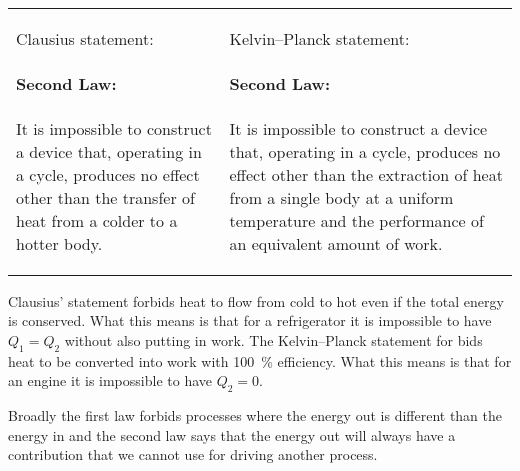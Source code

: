 \documentclass[a4paper]{article}
\begin{document}
    \begin{tabular}{p{}p{}}
        Clausius statement:
        \paragraph{Second Law:} It is impossible to construct a device that, operating in a cycle, produces no effect other than the transfer of heat from a colder to a hotter body. &
        
        Kelvin--Planck statement:
        \paragraph{Second Law:} It is impossible to construct a device that, operating in a cycle, produces no effect other than the extraction of heat from a single body at a uniform temperature and the performance of an equivalent amount of work.
    \end{tabular}
    Clausius' statement forbids heat to flow from cold to hot even if the total energy is conserved.
    What this means is that for a refrigerator it is impossible to have \(Q_1 = Q_2\) without also putting in work.
    The Kelvin--Planck statement for bids heat to be converted into work with \SI{100}{\percent} efficiency.
    What this means is that for an engine it is impossible to have \(Q_2 = 0\).
    
    Broadly the first law forbids processes where the energy out is different than the energy in and the second law says that the energy out will always have a contribution that we cannot use for driving another process.
    
\end{document}
